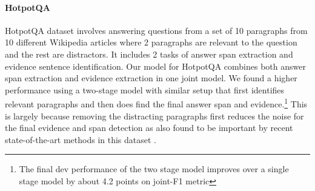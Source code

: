 \paragraph{HotpotQA}
HotpotQA dataset involves answering questions from a set of 10 paragraphs from 10 different Wikipedia articles where 2 paragraphs are relevant to the question and the rest are distractors. It includes 2 tasks of answer span extraction and evidence sentence identification.
Our model for HotpotQA combines both answer span extraction and evidence extraction in one joint model. 
We found a higher performance using a two-stage \model model with similar setup that first identifies relevant paragraphs and then does find the final answer span and evidence.\footnote{The final dev performance of the two stage model improves over a single stage model by about 4.2 points on joint-F1 metric}  This is largely because removing the distracting paragraphs first reduces the noise for the final evidence and span detection as also found to be important by recent state-of-the-art methods in this dataset \cite{hotpotqasota}.
